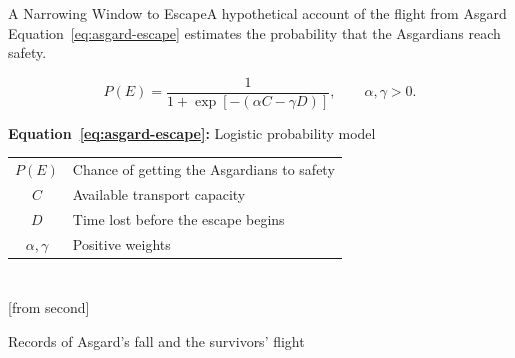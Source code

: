 \begin{frame}{A Narrowing Window to Escape}{A hypothetical account of the flight from Asgard}
    Equation~\eqref{eq:asgard-escape} estimates the probability that the Asgardians reach safety.
    \begin{SlideFormulaLegend}
    {\Large
    \begin{equation}
        P(E)=\frac{1}{1+\exp[-(\alpha C-\gamma D)]},\qquad \alpha,\gamma>0.
        \label{eq:asgard-escape}
    \end{equation}}
    {\footnotesize\textbf{Equation~\ref{eq:asgard-escape}:} Logistic probability model\par}
    \bigskip
    {\footnotesize
    \begin{tabular}{@{}cl@{}}
        $P(E)$ & Chance of getting the Asgardians to safety\\
        $C$ & Available transport capacity\\
        $D$ & Time lost before the escape begins\\
        $\alpha,\gamma$ & Positive weights\\
    \end{tabular}}
    \end{SlideFormulaLegend}
\end{frame}

\section{}
[from second]
\begin{frame}[allowframebreaks]{}{Records of Asgard's fall and the survivors' flight}
    \begin{SlideReferences}
    
    
    \end{SlideReferences}
\end{frame}
